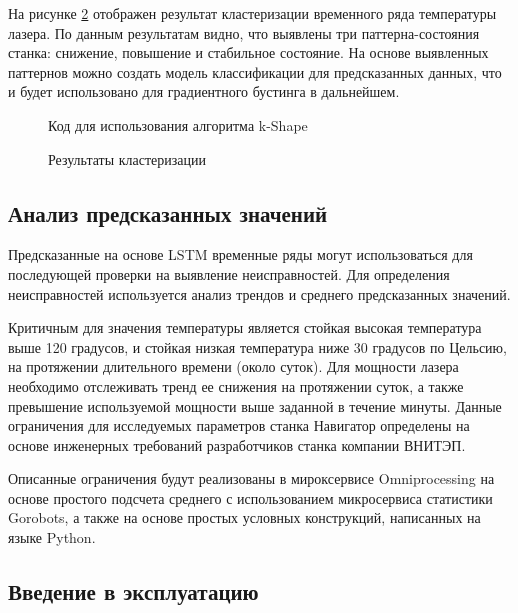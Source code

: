 На рисунке \ref{kshaperes} отображен результат кластеризации временного ряда
температуры лазера. По данным результатам видно, что выявлены
три паттерна-состояния станка: снижение, повышение и стабильное состояние.
На основе выявленных паттернов можно создать модель классификации
для предсказанных данных, что и будет использовано для градиентного бустинга
в дальнейшем.

\begin{figure}[H]
    \caption{Код для использования алгоритма k-Shape}
    \label{kshapecode}
\end{figure}

\begin{figure}[H]
    \caption{Результаты кластеризации}
    \label{kshaperes}
\end{figure}

\subsection{Анализ предсказанных значений}

Предсказанные на основе LSTM
временные ряды могут использоваться для
последующей проверки на выявление неисправностей.
Для определения неисправностей используется
анализ трендов и среднего предсказанных значений.

Критичным для значения температуры
является стойкая высокая температура выше 120 градусов,
и стойкая низкая температура ниже 30 градусов по Цельсию,
на протяжении длительного времени (около суток).
Для мощности лазера необходимо отслеживать
тренд ее снижения на протяжении суток, а также превышение используемой мощности выше заданной в течение минуты.
Данные ограничения для исследуемых параметров станка Навигатор
определены на основе инженерных требований разработчиков станка компании ВНИТЭП.

Описанные ограничения будут реализованы
в мироксервисе Omniprocessing на основе простого подсчета
среднего с использованием микросервиса статистики Gorobots,
а также на основе простых условных конструкций,
написанных на языке Python.

\subsection{Введение в эксплуатацию}


